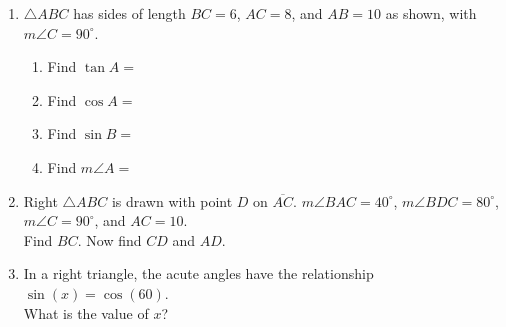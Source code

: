 \documentclass[12pt, twoside]{article}
\begin{document}
\begin{enumerate}
  \item $\triangle ABC$ has sides of length $BC=6$, $AC=8$, and $AB=10$ as shown, with $m\angle C=90^\circ$. \vspace{0.5cm}
  \begin{multicols}{2}
        \begin{enumerate}
          \item Find $\tan A =$ \vspace{0.75cm}
          \item Find $\cos A =$ \vspace{0.75cm}
          \item Find $\sin B =$ \vspace{0.75cm}
          \item Find $m\angle A =$ \vspace{0.75cm}
      \end{enumerate}
    \end{multicols} \vspace{0.5cm}

  \item Right $\triangle ABC$ is drawn with point $D$ on $\overline{AC}$. $m\angle BAC=40^\circ$, $m\angle BDC=80^\circ$, $m\angle C=90^\circ$, and $AC=10$. \\[0.5cm]
  Find $BC$. Now find $CD$ and $AD$. \vspace{0.5cm}
      \begin{flushright}
     \end{flushright}%

\newpage
  \item In a right triangle, the acute angles have the relationship $\sin (x)=\cos(60)$.\\[0.25cm]
    What is the value of $x$? \vspace{2cm}


\end{enumerate}
\end{document}
